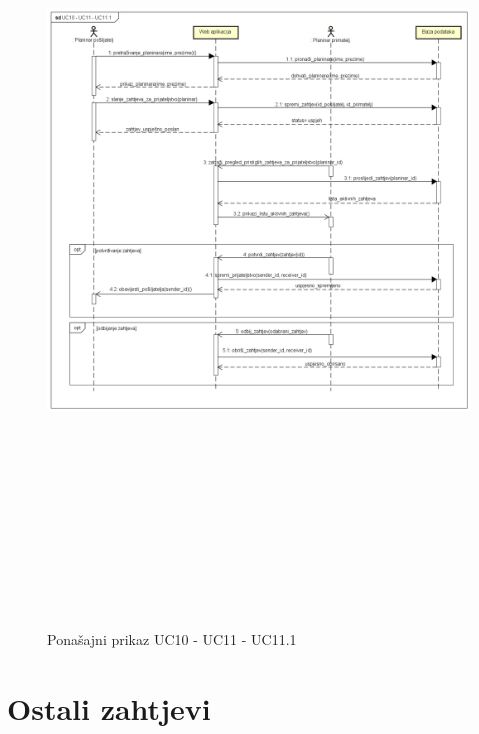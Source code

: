 				\begin{figure}[H]
					\includegraphics[scale=1.5, height=220mm, width=165mm]{dijagrami/seq-UC10 - UC11 - UC11.1.png} %
					\centering
					\caption{Ponašajni prikaz UC10 - UC11 - UC11.1}
					\label{fig:sekvencijski dijagrami}
				\end{figure}

				\eject
		\section{Ostali zahtjevi}
		
